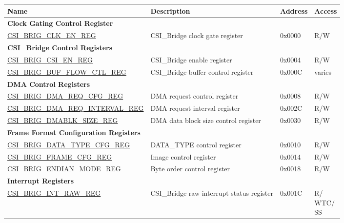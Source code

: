 \begin{longtable}{ | p{6cm} | p{7.2cm} | p{1.3cm} | p{1cm} | }
\hline\rowcolor{lightgray}
{\bfseries Name} & {\bfseries Description} &  {\bfseries Address} & {\bfseries Access} \\ \hline
\endhead
\multicolumn{4}{|l|}{\textbf{Clock Gating Control Register}} \\ \hline
\hyperref[regdesc:CSIBRIGCLKENREG]{CSI\_BRIG\_CLK\_EN\_REG} & CSI\_Bridge clock gate register & 0x0000 & R/W \\ \hline

\multicolumn{4}{|l|}{\textbf{CSI\_Bridge Control Registers}} \\ \hline
\hyperref[regdesc:CSIBRIGCSIENREG]{CSI\_BRIG\_CSI\_EN\_REG} & CSI\_Bridge enable register & 0x0004 & R/W \\ \hline
\hyperref[regdesc:CSIBRIGBUFFLOWCTLREG]{CSI\_BRIG\_BUF\_FLOW\_CTL\_REG} & CSI\_Bridge buffer control register & 0x000C & varies \\ \hline
\multicolumn{4}{|l|}{\textbf{DMA Control Registers}} \\ \hline
\hyperref[regdesc:CSIBRIGDMAREQCFGREG]{CSI\_BRIG\_DMA\_REQ\_CFG\_REG} & DMA request control register & 0x0008 & R/W \\ \hline
\hyperref[regdesc:CSIBRIGDMAREQINTERVALREG]{CSI\_BRIG\_DMA\_REQ\_INTERVAL\_REG} & DMA request interval register & 0x002C & R/W \\ \hline
\hyperref[regdesc:CSIBRIGDMABLKSIZEREG]{CSI\_BRIG\_DMABLK\_SIZE\_REG} & DMA data block size control register & 0x0030 & R/W \\ \hline
\multicolumn{4}{|l|}{\textbf{Frame Format Configuration Registers}} \\ \hline
\hyperref[regdesc:CSIBRIGDATATYPECFGREG]{CSI\_BRIG\_DATA\_TYPE\_CFG\_REG} & DATA\_TYPE control register & 0x0010 & R/W \\ \hline
\hyperref[regdesc:CSIBRIGFRAMECFGREG]{CSI\_BRIG\_FRAME\_CFG\_REG} & Image control register & 0x0014 & R/W \\ \hline
\hyperref[regdesc:CSIBRIGENDIANMODEREG]{CSI\_BRIG\_ENDIAN\_MODE\_REG} & Byte order control register & 0x0018 & R/W \\ \hline
\multicolumn{4}{|l|}{\textbf{Interrupt Registers}} \\ \hline
\hyperref[regdesc:CSIBRIGINTRAWREG]{CSI\_BRIG\_INT\_RAW\_REG} & CSI\_Bridge raw interrupt status register & 0x001C & \makecell[l]{R/\\WTC/\\SS} \\ \hline

\end{longtable}
